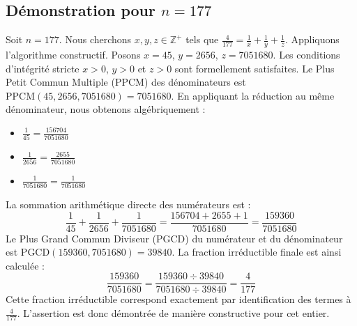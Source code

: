 \documentclass[11pt,a4paper]{article}
\begin{document}
\subsection{Démonstration pour $n = 177$}
Soit $n = 177$. Nous cherchons $x, y, z \in \mathbb{Z}^{+}$ tels que $\frac{4}{177} = \frac{1}{x} + \frac{1}{y} + \frac{1}{z}$.
Appliquons l'algorithme constructif. Posons $x = 45$, $y = 2656$, $z = 7051680$.
Les conditions d'intégrité stricte $x > 0$, $y > 0$ et $z > 0$ sont formellement satisfaites.
Le Plus Petit Commun Multiple (PPCM) des dénominateurs est $\text{PPCM}(45, 2656, 7051680) = 7051680$.
En appliquant la réduction au même dénominateur, nous obtenons algébriquement :
\begin{itemize}
    \item $\frac{1}{45} = \frac{156704}{7051680}$
    \item $\frac{1}{2656} = \frac{2655}{7051680}$
    \item $\frac{1}{7051680} = \frac{1}{7051680}$
\end{itemize}
La sommation arithmétique directe des numérateurs est :
$$ \frac{1}{45} + \frac{1}{2656} + \frac{1}{7051680} = \frac{156704 + 2655 + 1}{7051680} = \frac{159360}{7051680} $$
Le Plus Grand Commun Diviseur (PGCD) du numérateur et du dénominateur est $\text{PGCD}(159360, 7051680) = 39840$.
La fraction irréductible finale est ainsi calculée :
$$ \frac{159360}{7051680} = \frac{159360 \div 39840}{7051680 \div 39840} = \frac{4}{177} $$
Cette fraction irréductible correspond exactement par identification des termes à $\frac{4}{177}$. L'assertion est donc démontrée de manière constructive pour cet entier.
\end{document}
